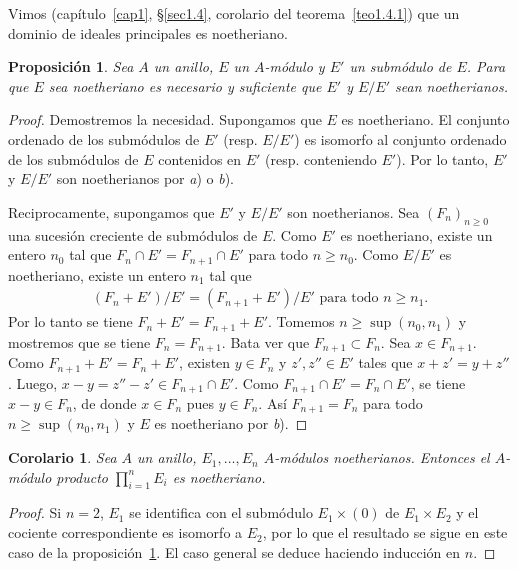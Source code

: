 \documentclass[oneside,bibtotoc,leqno,spanish]{amsbook}
\numberwithin{equation}{section}
\theoremstyle{defi}
\theoremstyle{note}
\newtheorem{proposition}{Proposici\'on}
\newtheorem{corollary}{Corolario}
\theoremstyle{rem}
\numberwithin{theorem}{section}
\numberwithin{proposition}{section}
\numberwithin{definition}{section}
\numberwithin{lemma}{section}
\numberwithin{corollary}{section}
\numberwithin{example}{section}
\numberwithin{footnote}{section}%
\begin{document}
Vimos (cap\'itulo~\ref{cap1}, \S\ref{sec1.4}, corolario del teorema~\ref{teo1.4.1}) que un
dominio de ideales principales es noetheriano.

\begin{proposition}\label{prop3.1.1}
Sea $A$ un anillo, $E$ un $A$-m\'odulo y $E'$ un subm\'odulo de $E$. Para que $E$ sea
noetheriano es necesario y suficiente que $E'$ y $E/E'$ sean noetherianos.
\end{proposition}

\begin{proof}
Demostremos la necesidad. Supongamos que $E$ es noetheriano. El conjunto ordenado de los
subm\'odulos de $E'$ (resp. $E/E'$) es isomorfo al conjunto ordenado de los subm\'odulos de $E$
contenidos en $E'$ (resp. conteniendo $E'$). Por lo tanto, $E'$ y $E/E'$ son noetherianos por {\itshape a})
o {\itshape b}).

Reciprocamente, supongamos que $E'$ y $E/E'$ son noetherianos. Sea $(F_{n})_{n\geq 0}$ una
sucesi\'on creciente de subm\'odulos de $E$. Como $E'$ es noetheriano, existe un entero
$n_{0}$ tal que $F_{n}\cap E' = F_{n+1}\cap E'$ para todo $n\geq n_{0}$. Como $E/E'$ es noetheriano,
existe un entero $n_{1}$ tal que
\begin{gather*}
(F_{n}+E')/E' = (F_{n+1}+E')/E'\text{ para todo }n\geq n_{1}.
\end{gather*}
Por lo tanto se tiene $F_{n}+E'=  F_{n+1}+E'$. Tomemos $n\geq\sup(n_{0},n_{1})$ y mostremos
que se tiene $F_{n} = F_{n+1}$. Bata ver que $F_{n+1}\subset F_{n}$. Sea $x\in F_{n+1}$.
Como $F_{n+1}+E' = F_{n}+E'$, existen $y\in F_{n}$ y $z',z''\in E'$ tales que
$x+z' = y+z''$. Luego, $x-y = z''-z'\in F_{n+1}\cap E'$. Como $F_{n+1}\cap E' = F_{n}\cap E'$,
se tiene $x-y\in F_{n}$, de donde $x\in F_{n}$ pues $y\in F_{n}$. As\'i $F_{n+1} = F_{n}$ para
todo $n\geq \sup(n_{0},n_{1})$ y $E$ es noetheriano por {\itshape b}).
\end{proof}

\begin{corollary}\label{cor3.1.1}
Sea $A$ un anillo, $E_{1},\dots,E_{n}$ $A$-m\'odulos noetherianos. Entonces el $A$-m\'odulo
producto $\prod_{i=1}^{n}E_{i}$ es noetheriano.
\end{corollary}

\begin{proof}
Si $n=2$, $E_{1}$ se identifica con el subm\'odulo $E_{1}\times(0)$ de $E_{1}\times E_{2}$ y el
cociente correspondiente es isomorfo a $E_{2}$, por lo que el resultado se sigue en este caso
de la proposici\'on~\ref{prop3.1.1}. El caso general se deduce haciendo inducci\'on en $n$.
\end{proof}
\end{document}
